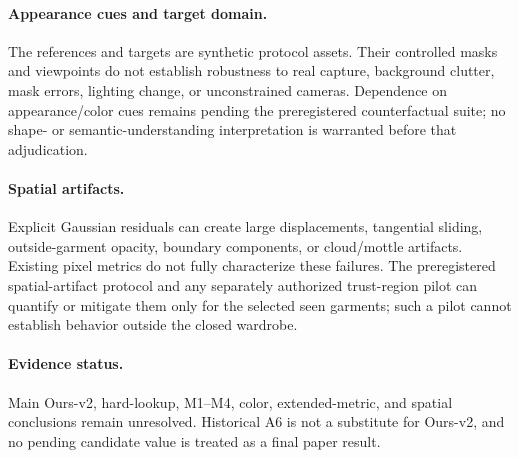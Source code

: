 \paragraph{Appearance cues and target domain.}
The references and targets are synthetic protocol assets. Their controlled masks and viewpoints do not establish robustness to real capture, background clutter, mask errors, lighting change, or unconstrained cameras. Dependence on appearance/color cues remains pending the preregistered counterfactual suite; no shape- or semantic-understanding interpretation is warranted before that adjudication.

\paragraph{Spatial artifacts.}
Explicit Gaussian residuals can create large displacements, tangential sliding, outside-garment opacity, boundary components, or cloud/mottle artifacts. Existing pixel metrics do not fully characterize these failures. The preregistered spatial-artifact protocol and any separately authorized trust-region pilot can quantify or mitigate them only for the selected seen garments; such a pilot cannot establish behavior outside the closed wardrobe.

\paragraph{Evidence status.}
Main Ours-v2, hard-lookup, M1--M4, color, extended-metric, and spatial conclusions remain unresolved. Historical A6 is not a substitute for Ours-v2, and no pending candidate value is treated as a final paper result.
